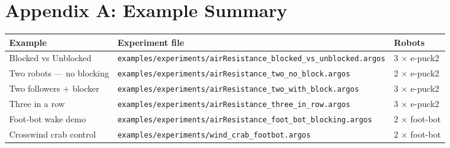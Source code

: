 \documentclass[11pt,a4paper]{article}
\begin{document}
\section*{Appendix A: Example Summary}
\begin{table}[H]
\centering
\small
\renewcommand{\arraystretch}{1.15}
\begin{tabularx}{\linewidth}{@{}L{3.6cm}X L{2.8cm}@{}}
\toprule
\textbf{Example} & \textbf{Experiment file} & \textbf{Robots}\\
\midrule
Blocked vs Unblocked & \nolinkurl{examples/experiments/airResistance_blocked_vs_unblocked.argos} & 3 $\times$ e-puck2\\
Two robots --- no blocking & \nolinkurl{examples/experiments/airResistance_two_no_block.argos} & 2 $\times$ e-puck2\\
Two followers + blocker & \nolinkurl{examples/experiments/airResistance_two_with_block.argos} & 3 $\times$ e-puck2\\
Three in a row & \nolinkurl{examples/experiments/airResistance_three_in_row.argos} & 3 $\times$ e-puck2\\
Foot-bot wake demo & \nolinkurl{examples/experiments/airResistance_foot_bot_blocking.argos} & 2 $\times$ foot-bot\\
Crosswind crab control & \nolinkurl{examples/experiments/wind_crab_footbot.argos} & 2 $\times$ foot-bot\\
\bottomrule
\end{tabularx}
\end{table}
\end{document}
